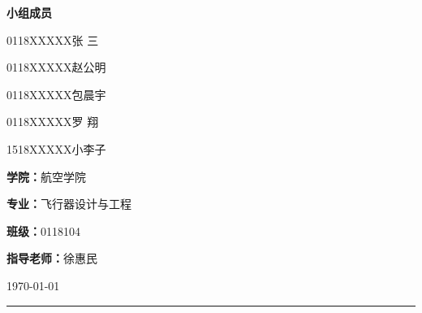 \begin{titlepage}
    {\Large \textbf{小组成员}}
    
    \vspace{0.01\textheight} 
    
    {\Large 0118XXXXX\quad 张 \quad 三}
    
    {\Large 0118XXXXX\quad 赵公明}
    
    {\Large 0118XXXXX\quad 包晨宇}
    
    {\Large 0118XXXXX\quad 罗 \quad 翔}
    
    {\Large 1518XXXXX\quad 小李子}
    
    \vspace{0.05\textheight} 
    
    {\Large \textbf{学院：}航空学院}
    \vspace{0.01\textheight} 
    
    {\Large \textbf{专业：}飞行器设计与工程}
    \vspace{0.01\textheight} 
    
    {\Large \textbf{班级：}0118104}
    \vspace{0.01\textheight} 
    
    {\Large \textbf{指导老师：}徐惠民}

    \vfill  %

    {\large \today}
    \vspace{0.05\textheight}  %


    \rule{\textwidth}{1pt}  %

  \end{titlepage}